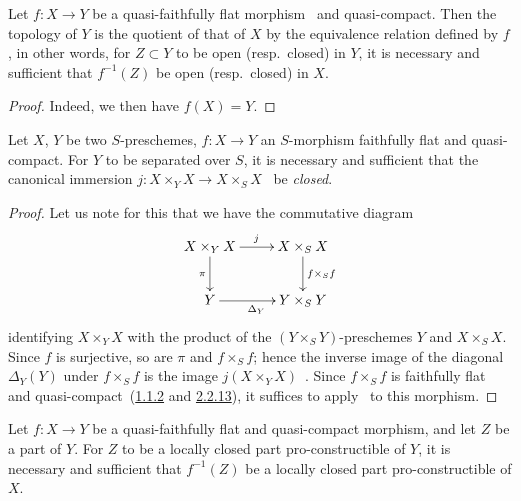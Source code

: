 \begin{corollary}[2.3.12]
\label{IV.2.3.12}
Let $f:X\to Y$ be a quasi-faithfully flat morphism~ and quasi-compact.
Then the topology of $Y$ is the quotient of that of $X$ by the equivalence relation defined by $f$, in other words, for $Z\subset Y$ to be open \textnormal{(}resp.\ closed\textnormal{)} in $Y$, it is necessary and sufficient that $f^{-1}(Z)$ be open \textnormal{(}resp.\ closed\textnormal{)} in $X$.
\end{corollary}

\begin{proof}
Indeed, we then have $f(X)=Y$.
\end{proof}

\begin{corollary}[2.3.13]
\label{IV.2.3.13}
Let $X$, $Y$ be two $S$-preschemes, $f:X\to Y$ an $S$-morphism faithfully flat and quasi-compact.
For $Y$ to be separated over $S$, it is necessary and sufficient that the canonical immersion $j:X\times_Y X\to X\times_S X$~ be \emph{closed}.
\end{corollary}

\begin{proof}
Let us note for this that we have the commutative diagram~
\[
\xymatrix{
  X\times_Y X \ar[r]^j \ar[d]_{\pi} & X\times_S X \ar[d]^{f\times_S f}\\
  Y \ar[r]_{\Delta_Y} & Y\times_S Y
}
\]
identifying $X\times_Y X$ with the product of the $(Y\times_S Y)$-preschemes $Y$ and $X\times_S X$.
Since $f$ is surjective, so are $\pi$ and $f\times_S f$; hence the inverse image of the diagonal $\Delta_Y(Y)$ under $f\times_S f$ is the image $j(X\times_Y X)$~.
Since $f\times_S f$ is faithfully flat and quasi-compact~({\hyperref[IV.1.1.2]{1.1.2}} and {\hyperref[IV.2.2.13]{2.2.13}}), it suffices to apply~ to this morphism.
\end{proof}

\begin{corollary}[2.3.14]
\label{IV.2.3.14}
Let $f:X\to Y$ be a quasi-faithfully flat and quasi-compact morphism, and let $Z$ be a part of $Y$.
For $Z$ to be a locally closed part pro-constructible of $Y$, it is necessary and sufficient that $f^{-1}(Z)$ be a locally closed part pro-constructible of $X$.
\end{corollary}

